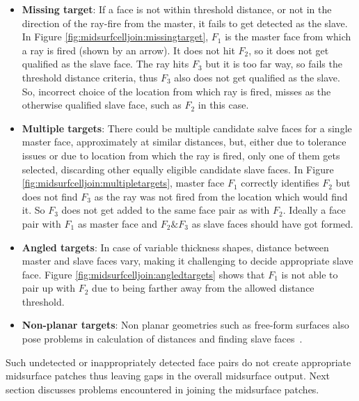 \begin{itemize}[noitemsep,topsep=2pt,parsep=2pt,partopsep=2pt]
\item \textbf{Missing target}: If a face is not within threshold distance, or not in the direction of the ray-fire from the master, it fails to get detected as the slave. In Figure \ref{fig:midsurfcelljoin:missingtarget}, $F_1$ is the master face from which a ray is fired (shown by an arrow). It does not hit $F_2$, so it does not get qualified as the slave face. The ray hits $F_3$ but it is too far way, so fails the threshold distance criteria, thus $F_3$ also does not get qualified as the slave. So, incorrect choice of the location from which ray is fired, misses as the otherwise qualified slave face, such as $F_2$ in this case.
\item \textbf{Multiple targets}: There could be multiple candidate salve faces for a single master face, approximately at similar distances, but, either due to tolerance issues or due to location from which the ray is fired, only one of them gets selected, discarding other equally eligible candidate slave faces. In Figure \ref{fig:midsurfcelljoin:multipletargets}, master face $F_1$ correctly identifies $F_2$ but does not find $F_3$ as the ray was not fired from the location which would find it. So $F_3$ does not get added to the same face pair as with $F_2$. Ideally a face pair with $F_1$ as master face and $F_2 \& F_3$ as slave faces should have got formed.
\item \textbf{Angled targets}: In case of variable thickness shapes, distance between master and slave faces vary, making it challenging to decide appropriate slave face. Figure \ref{fig:midsurfcelljoin:angledtargets} shows that $F_1$ is not able to pair up with $F_2$ due to being farther away from the allowed distance threshold.
\item \textbf{Non-planar targets}: Non planar geometries such as free-form surfaces also pose problems in calculation of distances and finding slave faces~\cite{Zhu2016}.
\end{itemize}

Such undetected or inappropriately detected face pairs do not create appropriate midsurface patches thus leaving gaps in the overall midsurface output. Next section discusses problems encountered in joining the midsurface patches.


